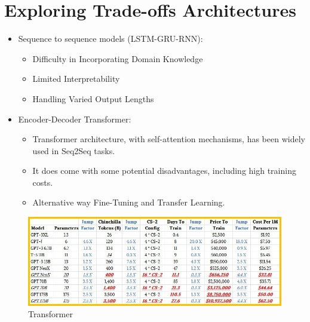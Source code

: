 \section{Exploring Trade-offs Architectures}
\begin{itemize}
    \item Sequence to sequence models (LSTM-GRU-RNN):
    \begin{itemize}
        \item Difficulty in Incorporating Domain Knowledge 
        \item Limited Interpretability
        \item Handling Varied Output Lengths
    \end{itemize}
    \item Encoder-Decoder Transformer:
    \begin{itemize}
        \item Transformer architecture, with self-attention mechanisms, has been widely used in Seq2Seq tasks.
        \item It does come with some potential disadvantages, including high training costs.
        \item Alternative way Fine-Tuning and Transfer Learning.
    \end{itemize}
\end{itemize}

\begin{figure}[h!]
	\centering
	\includegraphics[max height=\textheight,max width=\textwidth]{figures/transformer.jpeg}
	\caption{Transformer}
\end{figure}

